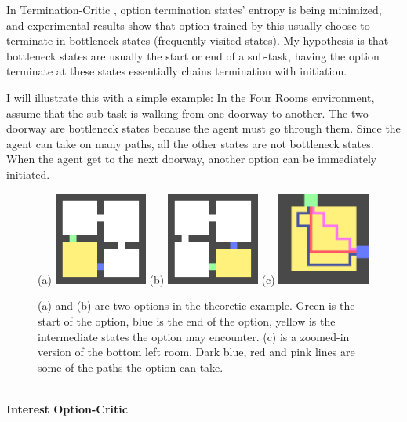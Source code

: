 \documentclass{article}
\begin{document}
	\normalsize{\quad In Termination-Critic \cite{harutyunyan2019termination}, option termination states' entropy is being minimized, and experimental results show that option trained by this usually choose to terminate in bottleneck states (frequently visited states). My hypothesis is that bottleneck states are usually the start or end of a sub-task, having the option terminate at these states essentially chains termination with initiation.
		
	\quad I will illustrate this with a simple example: In the Four Rooms environment, assume that the sub-task is walking from one doorway to another. The two doorway are bottleneck states because the agent must go through them. Since the agent can take on many paths, all the other states are not bottleneck states. When the agent get to the next doorway, another option can be immediately initiated.}
	\begin{figure}[h]
		\centering
		\large{(a)}
		\includegraphics[width=1.2in]{termCrit1.png}
		\hspace{0.2in}
		\large{(b)}
		\includegraphics[width=1.2in]{termCrit2.png}
		\hspace{0.2in}
		\large{(c)}
		\includegraphics[width=1.2in]{termCrit3.png}
		\caption{(a) and (b) are two options in the theoretic example. Green is the start of the option, blue is the end of the option, yellow is the intermediate states the option may encounter. (c) is a zoomed-in version of the bottom left room. Dark blue, red and pink lines are some of the paths the option can take.}
	\end{figure}\vspace{0.15in}\\
	\large{\bfseries{Interest Option-Critic}}\vspace{0.05in}
\end{document}
